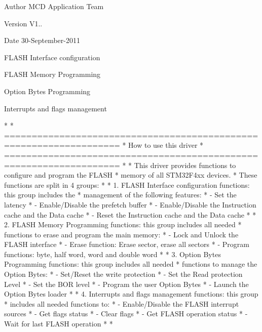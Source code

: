 \begin{DoxyAuthor}{Author}
M\+CD Application Team 
\end{DoxyAuthor}
\begin{DoxyVersion}{Version}
V1.. 
\end{DoxyVersion}
\begin{DoxyDate}{Date}
30-\/\+September-\/2011
\begin{DoxyItemize}
\item F\+L\+A\+SH Interface configuration
\item F\+L\+A\+SH Memory Programming
\item Option Bytes Programming
\item Interrupts and flags management
\end{DoxyItemize}
\end{DoxyDate}
\begin{DoxyVerb}*  
*          ===================================================================
*                                 How to use this driver
*          ===================================================================
*                           
*          This driver provides functions to configure and program the FLASH 
*          memory of all STM32F4xx devices.
*          These functions are split in 4 groups:
* 
*           1. FLASH Interface configuration functions: this group includes the
*              management of the following features:
*                    - Set the latency
*                    - Enable/Disable the prefetch buffer
*                    - Enable/Disable the Instruction cache and the Data cache
*                    - Reset the Instruction cache and the Data cache
*  
*           2. FLASH Memory Programming functions: this group includes all needed
*              functions to erase and program the main memory:
*                    - Lock and Unlock the FLASH interface
*                    - Erase function: Erase sector, erase all sectors
*                    - Program functions: byte, half word, word and double word
*  
*           3. Option Bytes Programming functions: this group includes all needed
*              functions to manage the Option Bytes:
*                    - Set/Reset the write protection
*                    - Set the Read protection Level
*                    - Set the BOR level
*                    - Program the user Option Bytes
*                    - Launch the Option Bytes loader
*  
*           4. Interrupts and flags management functions: this group 
*              includes all needed functions to:
*                    - Enable/Disable the FLASH interrupt sources
*                    - Get flags status
*                    - Clear flags
*                    - Get FLASH operation status
*                    - Wait for last FLASH operation
* 
*  \end{DoxyVerb}


